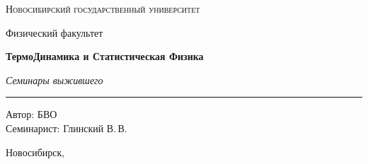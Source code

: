 \documentclass[12pt,a4paper]{report}
\begin{document}
\hypersetup{pageanchor=false}
\begin{titlepage}
    \thispagestyle{empty}

    \begin{center}
        \vspace*{1.5cm}

        {\Large\scshape Новосибирский государственный университет\par}
        \vspace{0.25cm}
        {\large Физический факультет\par}

        \vfill

        {\Huge\bfseries ТермоДинамика и Статистическая Физика\par}

        \vspace{0.45cm}

        {\Large\itshape Семинары выжившего\par}

        \vspace{0.8cm}

        \rule{0.72\linewidth}{0 pt}





        \vfill

        \begin{flushright}
            \large
            Автор: БВО\\[0.25cm]
            Семинарист: Глинский В.\,В.
        \end{flushright}

        \vspace{1.2cm}

        {\large Новосибирск, \the\year}

    \end{center}
\end{titlepage}
\hypersetup{pageanchor=true}

\begingroup
\footnotesize
\tableofcontents
\endgroup
\newpage



\clearpage

\clearpage

\clearpage

\clearpage

\clearpage



\clearpage

\clearpage

\clearpage

\clearpage
\end{document}
